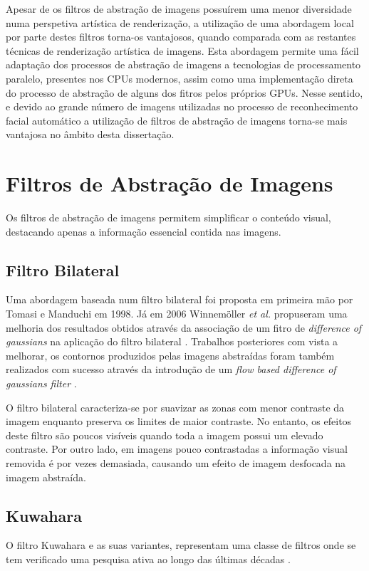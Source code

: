 Apesar de os filtros de abstração de imagens possuírem uma menor diversidade numa perspetiva artística de renderização, a utilização de uma abordagem local por parte destes filtros torna-os vantajosos, quando comparada com as restantes técnicas de renderização artística de imagens. Esta abordagem permite uma fácil adaptação dos processos de abstração de imagens a tecnologias de processamento paralelo, presentes nos CPUs modernos, assim como uma implementação direta do processo de abstração de alguns dos fitros pelos próprios GPUs. Nesse sentido, e devido ao grande número de imagens utilizadas no processo de reconhecimento facial automático a utilização de filtros de abstração de imagens torna-se mais vantajosa no âmbito desta dissertação.

\section{Filtros de Abstração de Imagens}
Os filtros de abstração de imagens permitem simplificar o conteúdo visual, destacando apenas a informação essencial contida nas imagens. 

\subsection{Filtro Bilateral}
Uma abordagem baseada num filtro bilateral foi proposta em primeira mão por Tomasi e Manduchi em 1998. \cite{w} Já em 2006  Winnemöller \textit{et al.} propuseram uma melhoria dos resultados obtidos através da associação de um fitro de \textit{difference of gaussians} na aplicação do filtro bilateral \cite{w}. Trabalhos posteriores com vista a melhorar, os contornos produzidos pelas imagens abstraídas foram também realizados com sucesso através da introdução de um \textit{flow based difference of gaussians filter}  \cite{w}.

O filtro bilateral caracteriza-se por suavizar as zonas com menor contraste da imagem enquanto preserva os limites de maior contraste. No entanto, os efeitos deste filtro são poucos visíveis quando toda a imagem possui um elevado contraste. Por outro lado, em imagens pouco contrastadas a informação visual removida é por vezes demasiada, causando um efeito de imagem desfocada na imagem abstraída.

\subsection{Kuwahara}
O filtro Kuwahara e as suas variantes, representam uma classe de filtros onde se tem verificado uma pesquisa ativa ao longo das últimas décadas \cite{K2009}.

